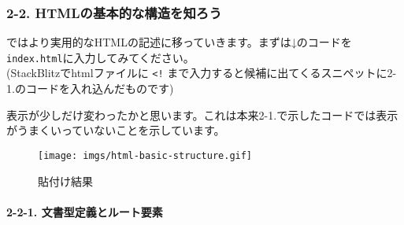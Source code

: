\subsubsection{2-2.
HTMLの基本的な構造を知ろう}\label{htmlux306eux57faux672cux7684ux306aux69cbux9020ux3092ux77e5ux308dux3046}

ではより実用的なHTMLの記述に移っていきます。まずは↓のコードを\texttt{index.html}に入力してみてください。\\
(StackBlitzでhtmlファイルに \texttt{\textless{}!}
まで入力すると候補に出てくるスニペットに2-1.のコードを入れ込んだものです)

\begin{Shaded}
\begin{Highlighting}[]
\DataTypeTok{\textgreater{}}
\DataTypeTok{\textless{}}\OperatorTok{=}\DataTypeTok{\textgreater{}}
  \DataTypeTok{\textless{}}\DataTypeTok{\textgreater{}}
    \DataTypeTok{\textless{}}\OperatorTok{=}\OtherTok{ }\DataTypeTok{/\textgreater{}}
    \DataTypeTok{\textless{}}\OperatorTok{=}\OperatorTok{=}\OtherTok{ }\DataTypeTok{/\textgreater{}}
    \DataTypeTok{\textless{}}\DataTypeTok{\textgreater{}}\DataTypeTok{\textless{}/}\DataTypeTok{\textgreater{}}
  \DataTypeTok{\textless{}/}\DataTypeTok{\textgreater{}}
  \DataTypeTok{\textless{}}\DataTypeTok{\textgreater{}}
    \DataTypeTok{\textless{}}\DataTypeTok{\textgreater{}}\DataTypeTok{\textless{}/}\DataTypeTok{\textgreater{}}
  \DataTypeTok{\textless{}/}\DataTypeTok{\textgreater{}}
\DataTypeTok{\textless{}/}\DataTypeTok{\textgreater{}}
\end{Highlighting}
\end{Shaded}

表示が少しだけ変わったかと思います。これは本来2-1.で示したコードでは表示がうまくいっていないことを示しています。

\begin{figure}
\centering
\texttt{[image: imgs/html-basic-structure.gif]}
\caption{貼付け結果}
\end{figure}

\paragraph{2-2-1.
文書型定義とルート要素}\label{ux6587ux66f8ux578bux5b9aux7fa9ux3068ux30ebux30fcux30c8ux8981ux7d20}

